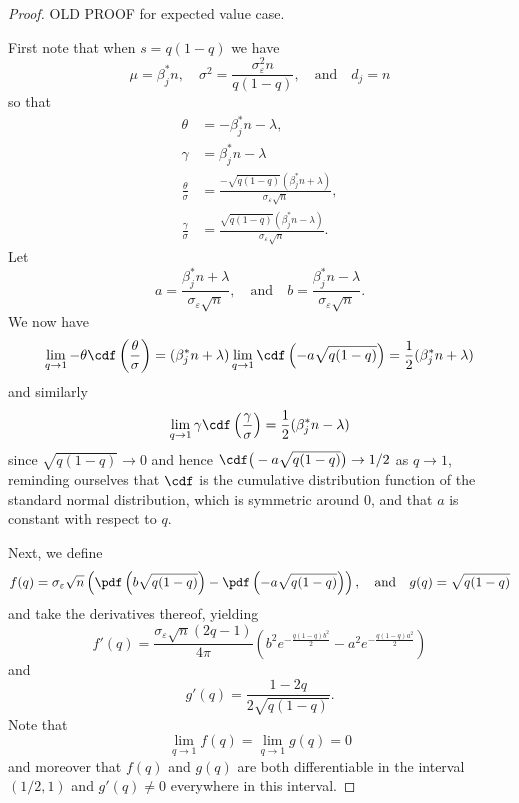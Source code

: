 \begin{proof}
  OLD PROOF for expected value case.

  First note that when \(s = q(1-q)\) we have
  \[
    \mu = \beta_j^* n, \quad \sigma^2 = \frac{\sigma_\varepsilon^2 n}{q(1-q)}, \quad\text{and}\quad d_j = n
  \]
  so that
  \[
    \begin{aligned}
      \theta                & = -\beta_j^* n - \lambda,                                                    \\
      \gamma                & = \beta_j^* n - \lambda                                                      \\
      \frac{\theta}{\sigma} & = \frac{-\sqrt{q(1-q)}(\beta_j^* n + \lambda)}{\sigma_\varepsilon \sqrt{n}}, \\
      \frac{\gamma}{\sigma} & = \frac{\sqrt{q(1-q)}(\beta_j^*n - \lambda)}{\sigma_\varepsilon \sqrt{n}}.
    \end{aligned}
  \]
  Let
  \[
    a = \frac{\beta_j^* n + \lambda}{\sigma_\varepsilon \sqrt{n}}, \quad\text{and}\quad b = \frac{\beta_j^* n - \lambda}{\sigma_\varepsilon \sqrt{n}}.
  \]
  We now have
  \[
    \lim_{q \rightarrow 1} -\theta \cdf\left(\frac{\theta}{\sigma}\right) = (\beta_j^*n + \lambda) \lim_{q \rightarrow 1} \cdf\left(-a\sqrt{q(1-q)}\right) = \frac{1}{2}(\beta_j^*n + \lambda)
  \]
  and similarly
  \[
    \lim_{q \rightarrow 1} \gamma \cdf\left(\frac{\gamma}{\sigma}\right) = \frac{1}{2}(\beta_j^*n - \lambda)
  \]
  since \(\sqrt{q(1-q)} \rightarrow 0\) and hence \(\cdf\big(-a\sqrt{q(1-q)}\big) \rightarrow 1/2\) as \(q \rightarrow 1\), reminding ourselves
  that \(\cdf\) is the cumulative distribution function of the standard normal distribution, which is symmetric around 0, and that \(a\) is constant with respect to \(q\).

  Next, we define
  \[
    f(q) = \sigma_\varepsilon \sqrt{n}\left(\pdf\left(b\sqrt{q(1-q)}\right) - \pdf\left(-a\sqrt{q(1-q)}\right)\right),\quad\text{and}\quad g(q) = \sqrt{q(1-q)}
  \]
  and take the derivatives thereof, yielding
  \[
    f'(q) = \frac{\sigma_\varepsilon \sqrt{n} (2q -1)}{4 \pi}\left(b^2 e^{-\frac{q(1-q)b^2}{2}}- a^2 e^{-\frac{q(1-q)a^2}{2}}\right)
  \]
  and
  \[
    g'(q) = \frac{1 - 2q}{2\sqrt{q(1-q)}}.
  \]
  Note that
  \[
    \lim_{q \rightarrow 1} f(q) = \lim_{q \rightarrow 1} g(q) = 0
  \]
  and moreover that \(f(q)\) and \(g(q)\) are both differentiable in the interval \((1/2, 1)\) and \(g'(q) \neq 0\) everywhere in this interval.


\end{proof}
